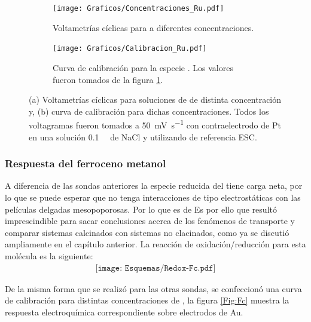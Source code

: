 {{			 \begin{figure}[ht]
	 	     \begin{subfigure}[t]{0.495\textwidth}
	         	\texttt{[image: Graficos/Concentraciones\_Ru.pdf]}
	        	\caption{Voltametrías cíclicas para \ru\space a diferentes concentraciones.}
	         	\label{fig:Ru_a}
	     		\end{subfigure}
     		 \begin{subfigure}[t]{0.495\textwidth}
	        	\texttt{[image: Graficos/Calibracion\_Ru.pdf]}
	       		\caption{Curva de calibración para la especie \ru. Los valores fueron tomados de la figura \ref{fig:Ru_a}.}
	         	\label{fig:Ru_b}
	     		\end{subfigure}
	     		\label{rutenio}
	     		\caption[Respuesta electroquímica para \ru]{(a) Voltametrías cíclicas para soluciones de \ru\space de distinta concentración y, (b) curva de calibración para dichas concentraciones. Todos los voltagramas fueron tomados a \SI{50}{\milli\volt\per\second} con contraelectrodo de Pt en una solución \SI{0.1}{\milli\Molar} de NaCl y utilizando de referencia ESC.}
	     	 \end{figure}
			 		 	 
		\subsubsection*{Respuesta del ferroceno metanol}
 	 	 
 	 	  A diferencia de las sondas anteriores la especie reducida del \fc\space tiene carga neta, por lo que se puede esperar que no tenga interacciones de tipo electrostáticas con las películas delgadas mesopoporosas. Por lo que es de  Es por ello que resultó imprescindible para sacar conclusiones acerca de los fenómenos de transporte y comparar sistemas calcinados con sistemas no clacinados, como ya se discutió ampliamente en el capítulo anterior. 
 	 	  La reacción de oxidación/reducción para esta molécula es la siguiente:
 	 				 \begin{equation}
 	 	 				\begin{aligned}
 	 	 				\texttt{[image: Esquemas/Redox-Fc.pdf]}
 	 	 				\end{aligned}
 	 	 			 \end{equation}
 	 	  
 	 	 De la misma forma que se realizó para las otras sondas, se confeccionó una curva de calibración para distintas concentraciones de \fc\space, la figura \ref{Fig:Fc} muestra la respuesta electroquímica correspondiente sobre electrodos de Au.
 	 				
}}
